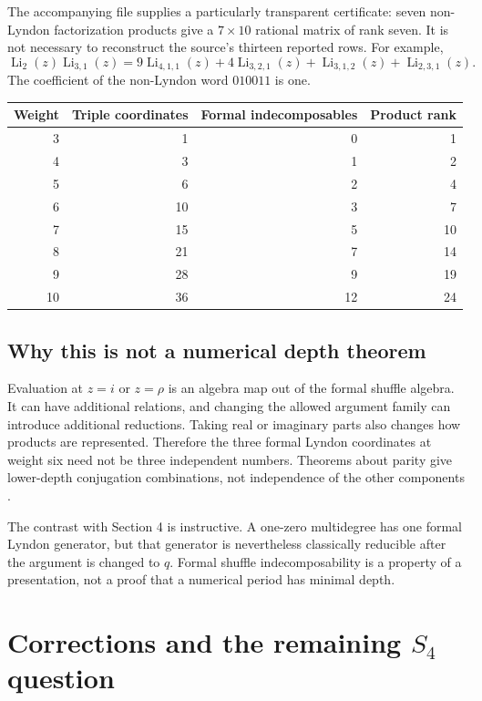 \documentclass[11pt]{article}
\numberwithin{equation}{section}
\theoremstyle{definition}\newtheorem{definition}[theorem]{Definition}
\theoremstyle{remark}\newtheorem{remark}[theorem]{Remark}
\DeclareMathOperator{\Li}{Li}
\newcommand{\code}[1]{\texttt{\detokenize{#1}}}
\begin{document}
The accompanying file \code{weight6_triples_shuffle.json} supplies a
particularly transparent certificate: seven non-Lyndon factorization
products give a $7\times10$ rational matrix of rank seven. It is not
necessary to reconstruct the source's thirteen reported rows.
For example,
\begin{equation}\label{eq:sampleproduct}
 \Li_2(z)\Li_{3,1}(z)
 =9\Li_{4,1,1}(z)+4\Li_{3,2,1}(z)
 +\Li_{3,1,2}(z)+\Li_{2,3,1}(z).
\end{equation}
The coefficient of the non-Lyndon word $010011$ is one.

\begin{center}
\begin{tabular}{rrrr}
\toprule
Weight & Triple coordinates & Formal indecomposables & Product rank\\
\midrule
3&1&0&1\\
4&3&1&2\\
5&6&2&4\\
6&10&3&7\\
7&15&5&10\\
8&21&7&14\\
9&28&9&19\\
10&36&12&24\\
\bottomrule
\end{tabular}
\end{center}

\subsection{Why this is not a numerical depth theorem}
Evaluation at $z=i$ or $z=\rho$ is an algebra map out of the formal
shuffle algebra. It can have additional relations, and changing the
allowed argument family can introduce additional reductions.
Taking real or imaginary parts also changes how products are represented.
Therefore the three formal Lyndon coordinates at weight six need not be
three independent numbers. Theorems about parity give lower-depth
conjugation combinations, not independence of the other components
\cite{Panzer,Umezawa}.

The contrast with Section 4 is instructive. A one-zero multidegree has
one formal Lyndon generator, but that generator is nevertheless
classically reducible after the argument is changed to $q$. Formal
shuffle indecomposability is a property of a presentation, not a proof
that a numerical period has minimal depth.

\section{Corrections and the remaining \texorpdfstring{$S_4$}{S4} question}
\end{document}
